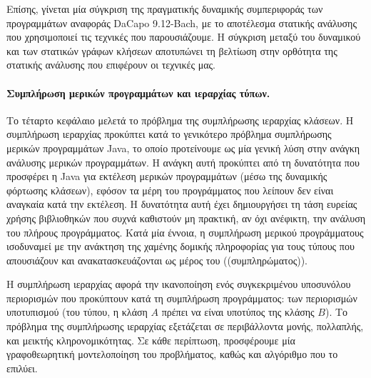 Επίσης, γίνεται μία σύγκριση της πραγματικής δυναμικής συμπεριφοράς
των προγραμμάτων αναφοράς {\en DaCapo 9.12-Bach}, με το αποτέλεσμα
στατικής ανάλυσης που χρησιμοποιεί τις τεχνικές που παρουσιάζουμε. Η
σύγκριση μεταξύ του δυναμικού και των στατικών γράφων κλήσεων
αποτυπώνει τη βελτίωση στην ορθότητα της στατικής ανάλυσης που
επιφέρουν οι τεχνικές μας.



\paragraph*{Συμπλήρωση μερικών προγραμμάτων και ιεραρχίας τύπων.}
Το τέταρτο κεφάλαιο μελετά το πρόβλημα της συμπλήρωσης ιεραρχίας
κλάσεων. Η συμπλήρωση ιεραρχίας προκύπτει κατά το γενικότερο πρόβλημα
συμπλήρωσης μερικών προγραμμάτων {\en Java}, το οποίο προτείνουμε ως
μία γενική λύση στην ανάγκη ανάλυσης μερικών προγραμμάτων. Η ανάγκη
αυτή προκύπτει από τη δυνατότητα που προσφέρει η {\en Java} για
εκτέλεση μερικών προγραμμάτων (μέσω της δυναμικής φόρτωσης κλάσεων),
εφόσον τα μέρη του προγράμματος που λείπουν δεν είναι αναγκαία κατά
την εκτέλεση. Η δυνατότητα αυτή έχει δημιουργήσει τη τάση ευρείας
χρήσης βιβλιοθηκών που συχνά καθιστούν μη πρακτική, αν όχι ανέφικτη,
την ανάλυση του πλήρους προγράμματος. Κατά μία έννοια, η συμπλήρωση
μερικού προγράμματους ισοδυναμεί με την ανάκτηση της χαμένης δομικής
πληροφορίας για τους τύπους που απουσιάζουν και ανακατασκευάζονται ως
μέρος του ((συμπληρώματος)).

Η συμπλήρωση ιεραρχίας αφορά την ικανοποίηση ενός συγκεκριμένου
υποσυνόλου περιορισμών που προκύπτουν κατά τη συμπλήρωση προγράμματος:
των περιορισμών υποτυπισμού (του τύπου, η κλάση \(A\) πρέπει να είναι
υποτύπος της κλάσης \(B\)). Το πρόβλημα της συμπλήρωσης ιεραρχίας
εξετάζεται σε περιβάλλοντα μονής, πολλαπλής, και μεικτής
κληρονομικότητας. Σε κάθε περίπτωση, προσφέρουμε μία γραφοθεωρητική
μοντελοποίηση του προβλήματος, καθώς και αλγόριθμο που το επιλύει.


